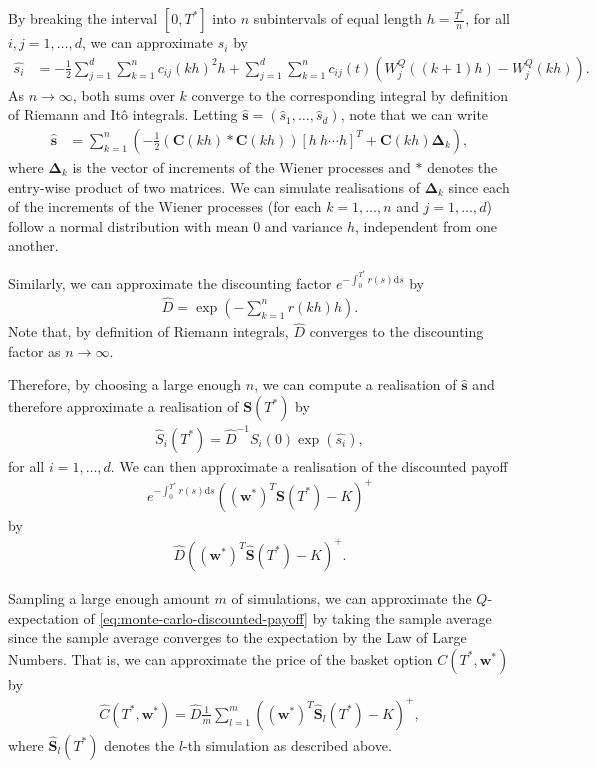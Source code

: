 \documentclass[english]{article}
\numberwithin{equation}{section}
\numberwithin{figure}{section}
\theoremstyle{bolddescit}
\theoremstyle{definition}
\theoremstyle{definition}
\theoremstyle{plain}
\theoremstyle{plain}
\theoremstyle{bolddesc}
\theoremstyle{plain}
\theoremstyle{remark}
\begin{document}
By breaking the interval $[0,T^*]$ into $n$ subintervals of equal length $h = \frac{T^*}{n}$, for all $i,j=1,\ldots,d$, we can approximate $s_i$ by
\begin{align*}
  \hat{s_i} &= - \frac{1}{2} \sum_{j=1}^{d} \sum_{k=1}^{n} c_{ij}(kh)^2 h + \sum_{j=1}^{d} \sum_{k=1}^{n}  c_{ij}(t) (W^Q_j((k+1)h) - W^Q_j(kh)).
\end{align*}
As $n \to \infty$, both sums over $k$ converge to the corresponding integral by definition of Riemann and It\^o integrals. Letting $\hat{\mathbf{s}} = (\hat{s}_1,\ldots,\hat{s}_d)$, note that we can write
\begin{align*}
  \hat{\mathbf{s}} &= \sum_{k=1}^{n} \left( - \frac{1}{2} (\mathbf{C}(kh) * \mathbf{C}(kh)) [h\ h \cdots h]^T + \mathbf{C}(kh) \mathbf{\Delta}_k \right),
\end{align*}
where $\mathbf{\Delta}_k$ is the vector of increments of the Wiener processes and $*$ denotes the entry-wise product of two matrices. We can simulate realisations of $\mathbf{\Delta}_k$ since each of the increments of the Wiener processes (for each $k=1,\ldots,n$ and $j=1,\ldots,d$) follow a normal distribution with mean 0 and variance $h$, independent from one another.

Similarly, we can approximate the discounting factor $e^{-\int_0^{T^*} r(s) \mathrm{d}s}$ by
\begin{align*}
  \hat{D} = \exp \left(-\sum_{k=1}^{n} r(kh) h\right).
\end{align*}
Note that, by definition of Riemann integrals, $\hat{D}$ converges to the discounting factor as $n \to \infty$.

Therefore, by choosing a large enough $n$, we can compute a realisation of $\hat{\mathbf{s}}$ and therefore approximate a realisation of $\mathbf{S}(T^*)$ by
\begin{align*}
  \hat{S}_i(T^*) = \hat{D}^{-1} S_i(0) \exp\left(\hat{s_i}\right),
\end{align*}
for all $i=1,\ldots,d$. We can then approximate a realisation of the discounted payoff
\begin{align}\label{eq:monte-carlo-discounted-payoff}
  e^{-\int_0^{T^*} r(s) \mathrm{d}s} ((\mathbf{w}^*)^T \mathbf{S}(T^*) - K)^+
\end{align}
by
\begin{align*}
  \hat{D} ((\mathbf{w}^*)^T \hat{\mathbf{S}}(T^*) - K)^+.
\end{align*}

Sampling a large enough amount $m$ of simulations, we can approximate the $Q$-expectation of \eqref{eq:monte-carlo-discounted-payoff} by taking the sample average since the sample average converges to the expectation by the Law of Large Numbers. That is, we can approximate the price of the basket option $C(T^*,\mathbf{w}^*)$ by
\begin{align*}
  \hat{C}(T^*,\mathbf{w}^*) = \hat{D} \frac{1}{m} \sum_{l=1}^{m} ((\mathbf{w}^*)^T \hat{\mathbf{S}}_l(T^*) - K)^+,
\end{align*}
where $\hat{\mathbf{S}}_l(T^*)$ denotes the $l$-th simulation as described above.
\end{document}
